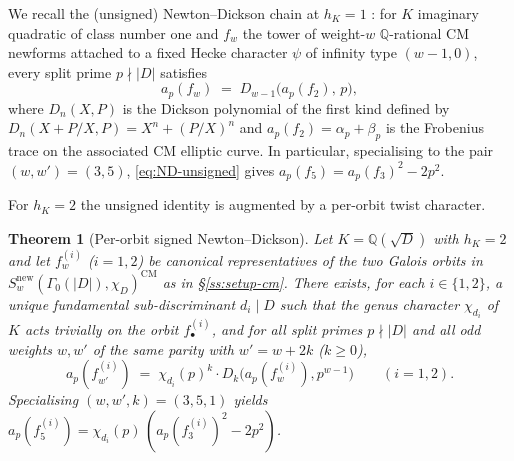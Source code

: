 \documentclass[11pt,a4paper]{amsart}
\theoremstyle{plain}
\newtheorem{theorem}{Theorem}[section]
\theoremstyle{definition}
\newcommand{\Q}{\mathbb{Q}}
\newcommand{\fl}[2]{f_{#1}^{(#2)}}
\newcommand{\absD}{\lvert D\rvert}
\begin{document}
We recall the (unsigned) Newton--Dickson chain at $h_K = 1$
\cite{Remondiere2026ND}: for $K$ imaginary quadratic of class number one and
$f_w$ the tower of weight-$w$ $\Q$-rational CM newforms attached to a fixed
Hecke character $\psi$ of infinity type $(w-1, 0)$, every split prime
$p \nmid \absD$ satisfies
\begin{equation}\label{eq:ND-unsigned}
   a_p(f_w) \;=\; D_{w-1}\bigl(a_p(f_2),\,p\bigr),
\end{equation}
where $D_n(X, P)$ is the Dickson polynomial of the first kind defined by
$D_n(X+P/X, P) = X^n + (P/X)^n$ and $a_p(f_2) = \alpha_p + \beta_p$ is the
Frobenius trace on the associated CM elliptic curve. In particular,
specialising to the pair $(w, w') = (3, 5)$,
\eqref{eq:ND-unsigned} gives
$a_p(f_5) = a_p(f_3)^2 - 2p^2$.

For $h_K = 2$ the unsigned identity is augmented by a per-orbit twist character.

\begin{theorem}[Per-orbit signed Newton--Dickson]\label{thm:newton-dickson}
Let $K = \Q(\sqrt{D})$ with $h_K = 2$ and let $\fl{w}{i}$ ($i = 1, 2$) be
canonical representatives of the two Galois orbits in
$S_w^{\mathrm{new}}(\Gamma_0(\absD), \chi_D)^{\mathrm{CM}}$ as in
\S\ref{ss:setup-cm}. There exists, for each $i \in \{1, 2\}$, a unique
fundamental sub-discriminant $d_i \mid D$ such that the genus character
$\chi_{d_i}$ of $K$ acts trivially on the orbit $\fl{\bullet}{i}$, and for
all split primes $p \nmid \absD$ and all odd weights $w, w'$ of the same
parity with $w' = w + 2k$ ($k \ge 0$),
\begin{equation}\label{eq:nd-signed}
   a_p(\fl{w'}{i}) \;=\; \chi_{d_i}(p)^k \cdot
     D_k\bigl(a_p(\fl{w}{i}), p^{w-1}\bigr)
   \qquad (\text{$i = 1, 2$}).
\end{equation}
Specialising $(w, w', k) = (3, 5, 1)$ yields
$a_p(\fl{5}{i}) = \chi_{d_i}(p)\,(a_p(\fl{3}{i})^2 - 2 p^2)$.
\end{theorem}
\end{document}
